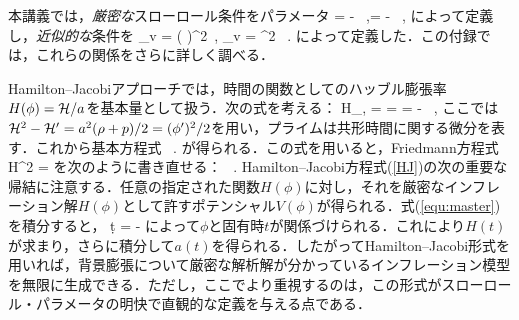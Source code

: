 \newpage
{}
\label{sec:HSR}

\setcounter{equation}{0}
\renewcommand{\theequation}{B.\arabic{equation}}



本講義では，\textit{厳密な}スローロール条件をパラメータ
\beq
\varepsilon = - \, ,\qquad \eta = - \, ,
\eeq
によって定義し，\textit{近似的な}条件を
\beq
\epsilon_{\rm v} =  \left( \right)^2\, , \qquad \eta_{\rm v} = \Mp^2 \, .
\eeq
によって定義した．この付録では，これらの関係をさらに詳しく調べる．



Hamilton--Jacobiアプローチでは，時間の関数としてのハッブル膨張率$H(\phi)= {\cal H}/a$を基本量として扱う．次の式を考える：
\beq
H_{,\phi} =  =  = - \, ,
\eeq
ここでは${\cal H}^2 -{\cal H}' = a^2 (\rho + p)/2 =  (\phi')^2/2$を用い，プライムは共形時間に関する微分を表す．これから基本方程式
\beq
\label{equ:master}
\, .
\eeq
が得られる．この式を用いると，Friedmann方程式
\beq
H^2 =  
\eeq
を次のように書き直せる：
\beq
\label{HJ}
\, .
\eeq
Hamilton--Jacobi方程式(\ref{HJ})の次の重要な帰結に注意する．任意の指定された関数$H(\phi)$に対し，それを厳密なインフレーション解$H(\phi)$として許すポテンシャル$V(\phi)$が得られる．式(\ref{equ:master})を積分すると，
\beq
\int \d t = - \int {}
\eeq
によって$\phi$と固有時$t$が関係づけられる．これにより$H(t)$が求まり，さらに積分して$a(t)$を得られる．したがってHamilton--Jacobi形式を用いれば，背景膨張について厳密な解析解が分かっているインフレーション模型を無限に生成できる．ただし，ここでより重視するのは，この形式がスローロール・パラメータの明快で直観的な定義を与える点である．






